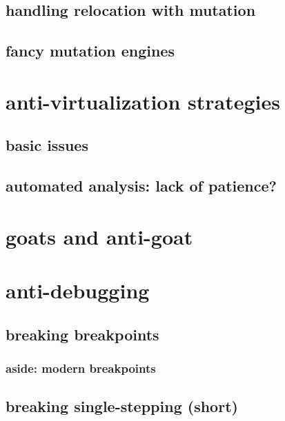 \subsection{handling relocation with mutation}


\subsection{fancy mutation engines}


\section{anti-virtualization strategies}
\subsection{basic issues}


\subsection{automated analysis: lack of patience?}


\section{goats and anti-goat}


\section{anti-debugging}


\subsection{breaking breakpoints}



\subsubsection{aside: modern breakpoints}


\subsection{breaking single-stepping (short)}


